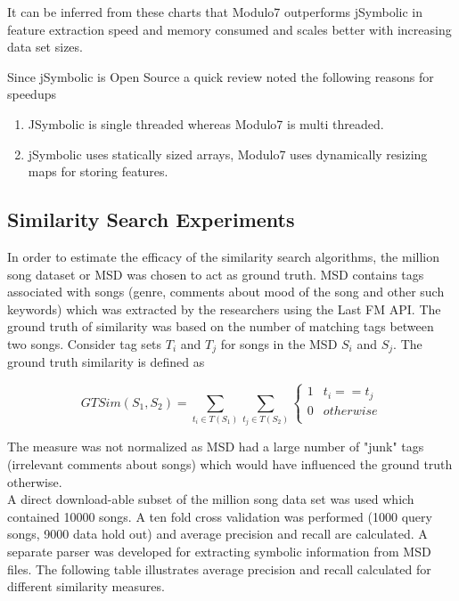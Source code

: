 \documentclass{article}
\begin{document}
\noindent It can be inferred from these charts that Modulo7 outperforms jSymbolic in feature extraction speed and memory consumed and scales better with increasing data set sizes. 

\noindent Since jSymbolic is Open Source a quick review noted the following reasons for speedups

\begin{enumerate}
\item JSymbolic is single threaded whereas Modulo7 is multi threaded.
\item jSymbolic uses statically sized arrays, Modulo7 uses dynamically resizing maps for storing features.
\end{enumerate}

\subsection{Similarity Search Experiments}

\noindent In order to estimate the efficacy of the similarity search algorithms, the million song dataset or MSD \cite{msd} was chosen to act as ground truth. MSD contains tags associated with songs (genre, comments about mood of the song and other such keywords) which was extracted by the researchers using the Last FM API. The ground truth of similarity was based on the number of matching tags between two songs. Consider tag sets $T_i$ and $T_j$ for songs in the MSD $S_i$ and $S_j$. The ground truth similarity is defined as 

\begin{equation} \label{taghitrate}
GTSim(S_1, S_2) = \sum_{t_i \in T(S_1)} \sum_{t_j \in T(S_2)} \begin{cases} 
      1 & t_i == t_j \\
      0 & otherwise \\  \end{cases}
\end{equation}

\noindent The measure was not normalized as MSD had a large number of "junk" tags (irrelevant comments about songs) which would have influenced the ground truth otherwise. \\

\noindent A direct download-able subset of the million song data set was used which contained 10000 songs. A ten fold cross validation was performed (1000 query songs, 9000 data hold out) and average precision and recall are calculated. A separate parser was developed for extracting symbolic information from MSD files. The following table illustrates average precision and recall calculated for different similarity measures. 
\end{document}
